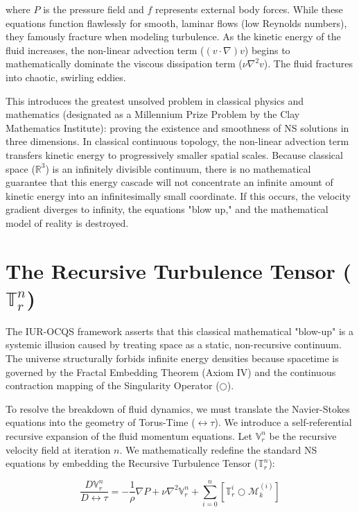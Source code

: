 \documentclass[12pt,openany]{book}
\begin{document}
where $P$ is the pressure field and $f$ represents external body forces. While these equations function flawlessly for smooth, laminar flows (low Reynolds numbers), they famously fracture when modeling turbulence. As the kinetic energy of the fluid increases, the non-linear advection term ($(v \cdot \nabla)v$) begins to mathematically dominate the viscous dissipation term ($\nu\nabla^2v$). The fluid fractures into chaotic, swirling eddies.

This introduces the greatest unsolved problem in classical physics and mathematics (designated as a Millennium Prize Problem by the Clay Mathematics Institute): proving the existence and smoothness of NS solutions in three dimensions. In classical continuous topology, the non-linear advection term transfers kinetic energy to progressively smaller spatial scales. Because classical space ($\mathbb{R}^3$) is an infinitely divisible continuum, there is no mathematical guarantee that this energy cascade will not concentrate an infinite amount of kinetic energy into an infinitesimally small coordinate. If this occurs, the velocity gradient diverges to infinity, the equations "blow up," and the mathematical model of reality is destroyed.

\section{The Recursive Turbulence Tensor ($\mathbb{T}_r^n$)}
The IUR-OCQS framework asserts that this classical mathematical "blow-up" is a systemic illusion caused by treating space as a static, non-recursive continuum. The universe structurally forbids infinite energy densities because spacetime is governed by the Fractal Embedding Theorem (Axiom IV) and the continuous contraction mapping of the Singularity Operator ($\bigcirc$).

To resolve the breakdown of fluid dynamics, we must translate the Navier-Stokes equations into the geometry of Torus-Time ($\leftrightarrow\tau$). We introduce a self-referential recursive expansion of the fluid momentum equations. Let $\mathbb{V}_r^n$ be the recursive velocity field at iteration $n$. We mathematically redefine the standard NS equations by embedding the Recursive Turbulence Tensor ($\mathbb{T}_r^n$):

\begin{equation}
\frac{D\mathbb{V}_r^n}{D\leftrightarrow\tau} = -\frac{1}{\rho}\nabla P + \nu\nabla^2\mathbb{V}_r^n + \sum_{i=0}^n \left[ \mathbb{T}_r^i \bigcirc \mathcal{M}_k^{(i)} \right]
\end{equation}
\end{document}
